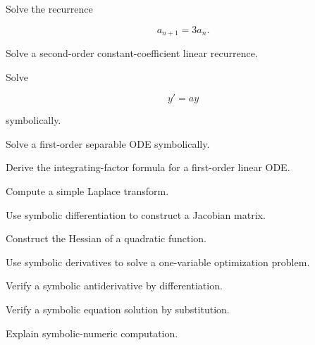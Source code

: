 \begin{exercise}[3]
Solve the recurrence

\[
a_{n+1}=3a_n.
\]
\end{exercise}

\begin{exercise}[3]
Solve a second-order constant-coefficient linear recurrence.
\end{exercise}

\begin{exercise}[2]
Solve

\[
y'=ay
\]

symbolically.
\end{exercise}

\begin{exercise}[3]
Solve a first-order separable ODE symbolically.
\end{exercise}

\begin{exercise}[3]
Derive the integrating-factor formula for a first-order linear ODE.
\end{exercise}

\begin{exercise}[3]
Compute a simple Laplace transform.
\end{exercise}

\begin{exercise}[3]
Use symbolic differentiation to construct a Jacobian matrix.
\end{exercise}

\begin{exercise}[3]
Construct the Hessian of a quadratic function.
\end{exercise}

\begin{exercise}[3]
Use symbolic derivatives to solve a one-variable optimization problem.
\end{exercise}

\begin{exercise}[3]
Verify a symbolic antiderivative by differentiation.
\end{exercise}

\begin{exercise}[3]
Verify a symbolic equation solution by substitution.
\end{exercise}

\begin{exercise}[3]
Explain symbolic-numeric computation.
\end{exercise}

